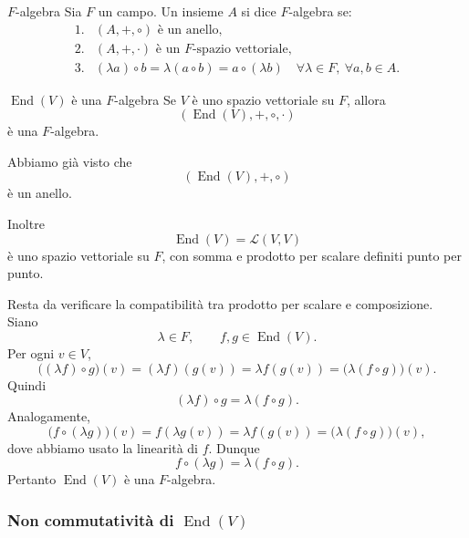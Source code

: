 \documentclass[a4paper]{article}
\begin{document}
\begin{snippetdefinition}{\(F\)-algebra}
    Sia \(F\) un campo. Un insieme \(A\) si dice \(F\)-algebra se:
    \[
        \begin{array}{ll}
            \text{1.} & (A,+,\circ) \text{ è un anello},\\
            \text{2.} & (A,+,\cdot) \text{ è un \(F\)-spazio vettoriale},\\
            \text{3.} & (\lambda a)\circ b=\lambda(a\circ b)=a\circ(\lambda b)
            \quad
            \forall \lambda\in F,\ \forall a,b\in A.
        \end{array}
    \]
\end{snippetdefinition}

\begin{snippetproposition}{\(\operatorname{End}(V)\) è una \(F\)-algebra}
    Se \(V\) è uno spazio vettoriale su \(F\), allora
    \[
        (\operatorname{End}(V),+,\circ,\cdot)
    \]
    è una \(F\)-algebra.
\end{snippetproposition}

\begin{snippetproof}{}
    Abbiamo già visto che
    \[
        (\operatorname{End}(V),+,\circ)
    \]
    è un anello.

    Inoltre
    \[
        \operatorname{End}(V)=\mathcal{L}(V,V)
    \]
    è uno spazio vettoriale su \(F\), con somma e prodotto per scalare definiti punto per punto.

    Resta da verificare la compatibilità tra prodotto per scalare e composizione. Siano
    \[
        \lambda\in F,
        \qquad
        f,g\in\operatorname{End}(V).
    \]
    Per ogni \(v\in V\),
    \[
        \bigl((\lambda f)\circ g\bigr)(v)
        =
        (\lambda f)(g(v))
        =
        \lambda f(g(v))
        =
        \bigl(\lambda(f\circ g)\bigr)(v).
    \]
    Quindi
    \[
        (\lambda f)\circ g=\lambda(f\circ g).
    \]
    Analogamente,
    \[
        \bigl(f\circ(\lambda g)\bigr)(v)
        =
        f(\lambda g(v))
        =
        \lambda f(g(v))
        =
        \bigl(\lambda(f\circ g)\bigr)(v),
    \]
    dove abbiamo usato la linearità di \(f\). Dunque
    \[
        f\circ(\lambda g)=\lambda(f\circ g).
    \]
    Pertanto \(\operatorname{End}(V)\) è una \(F\)-algebra.
\end{snippetproof}

\subsubsection{Non commutatività di \texorpdfstring{\(\operatorname{End}(V)\)}{End(V)}}
\end{document}
